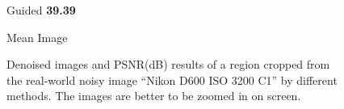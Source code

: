 \begin{figure}[t!]
{\begin{minipage}[t]{0.19\textwidth}
{\footnotesize Guided \textbf{39.39}}
\end{minipage}
\begin{minipage}[t]{0.19\textwidth}
\centering
{}
{\footnotesize Mean Image}
\end{minipage}
}\vspace{-3mm}
    \caption{Denoised images and PSNR(dB) results of a region cropped from the real-world noisy image ``Nikon D600 ISO 3200 C1'' \cite{crosschannel2016} by different methods. The images are better to be zoomed in on screen.}
    \label{fig3-7}
\end{figure}


